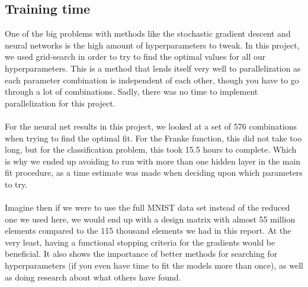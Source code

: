 \documentclass[a4paper]{article}
\begin{document}
\subsection{Training time} \label{sec:za_warudo}
One of the big problems with methods like the stochastic gradient descent and neural networks is the high amount of hyperparameters to tweak. In this project, we used grid-search in order to try to find the optimal values for all our hyperparameters. This is a method that lends itself very well to parallelization as each parameter combination is independent of each other, though you have to go through a lot of combinations. Sadly, there was no time to implement parallelization for this project.
\\\\
For the neural net results in this project, we looked at a set of 576 combinations when trying to find the optimal fit. For the Franke function, this did not take too long, but for the classification problem, this took 15.5 hours to complete. Which is why we ended up avoiding to run with more than one hidden layer in the main fit procedure, as a time estimate was made when deciding upon which parameters to try.
\\\\
Imagine then if we were to use the full MNIST data set instead of the reduced one we used here, we would end up with a design matrix with almost 55 million elements
compared to the 115 thousand elements we had in this report. At the very least, having a functional stopping criteria for the gradients would be beneficial. It also shows the importance of better methods for searching for hyperparameters (if you even have time to fit the models more than once), as well as doing research about what others have found. 

\end{document}
